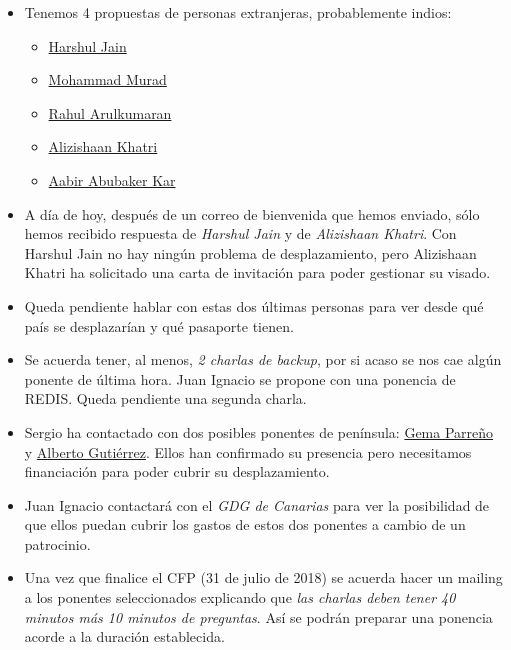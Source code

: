 \documentclass[a4paper, 12pt]{article}
\begin{document}
\begin{itemize}
    \item Tenemos 4 propuestas de personas extranjeras, probablemente indios:
    \begin{itemize}
        \item \href{https://twitter.com/harshulrobo}{Harshul Jain}
        \item \href{https://twitter.com/m_m_murad}{Mohammad Murad}
        \item \href{https://www.linkedin.com/in/rahul-arulkumaran}{Rahul Arulkumaran}
        \item \href{https://www.linkedin.com/in/alizishaan-khatri-32a20637}{Alizishaan Khatri}
        \item \href{https://www.linkedin.com/in/aabir}{Aabir Abubaker Kar}
    \end{itemize}
    \item A día de hoy, después de un correo de bienvenida que hemos enviado, sólo hemos recibido respuesta de \textit{Harshul Jain} y de \textit{Alizishaan Khatri}. Con Harshul Jain no hay ningún problema de desplazamiento, pero Alizishaan Khatri ha solicitado una carta de invitación para poder gestionar su visado.
    \item Queda pendiente hablar con estas dos últimas personas para ver desde qué país se desplazarían y qué pasaporte tienen.
    \item Se acuerda tener, al menos, \textit{2 charlas de backup}, por si acaso se nos cae algún ponente de última hora. Juan Ignacio se propone con una ponencia de REDIS. Queda pendiente una segunda charla.
    \item Sergio ha contactado con dos posibles ponentes de península: \href{https://twitter.com/SoyGema}{Gema Parreño} y \href{https://twitter.com/aljesusg}{Alberto Gutiérrez}. Ellos han confirmado su presencia pero necesitamos financiación para poder cubrir su desplazamiento.
    \item Juan Ignacio contactará con el \textit{GDG de Canarias} para ver la posibilidad de que ellos puedan cubrir los gastos de estos dos ponentes a cambio de un patrocinio.
    \item Una vez que finalice el CFP (31 de julio de 2018) se acuerda hacer un mailing a los ponentes seleccionados explicando que \textit{las charlas deben tener 40 minutos más 10 minutos de preguntas}. Así se podrán preparar una ponencia acorde a la duración establecida.
\end{itemize}
\end{document}
